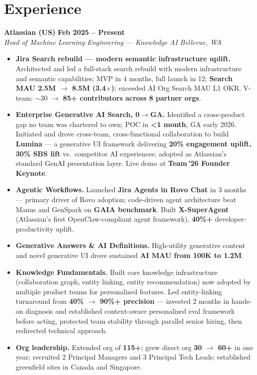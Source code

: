 \documentclass[10.5pt,letterpaper]{article}
\newcommand{\role}[4]{%
  \noindent\textbf{#1} \hfill \textbf{#3}\\
  \textit{#2} \hfill \textit{#4}\par\vspace{1pt}}
\begin{document}
\section*{Experience}

\role{Atlassian (US)}{Head of Machine Learning Engineering --- Knowledge AI}{Feb 2025 -- Present}{Bellevue, WA}
\begin{itemize}
  \item \textbf{Jira Search rebuild --- modern semantic infrastructure uplift.} Architected and led a full-stack search rebuild with modern infrastructure and semantic capabilities; MVP in 4 months, full launch in 12; \textbf{Search MAU 2.5M $\to$ 8.5M (3.4$\times$)}; exceeded AI Org Search MAU L1 OKR. V-team: $\sim$30 $\to$ \textbf{85+ contributors across 8 partner orgs}.
  \item \textbf{Enterprise Generative AI Search, 0$\to$GA.} Identified a cross-product gap no team was chartered to own; POC in \textbf{<1 month}, GA early 2026. Initiated and drove cross-team, cross-functional collaboration to build \textbf{Lumina} --- a generative UI framework delivering \textbf{20\% engagement uplift, 30\% SBS lift} vs.\ competitor AI experiences; adopted as Atlassian's standard GenAI presentation layer. Live demo at \textbf{Team\,'26 Founder Keynote}.
  \item \textbf{Agentic Workflows.} Launched \textbf{Jira Agents in Rovo Chat} in 3 months --- primary driver of Rovo adoption; code-driven agent architecture beat Manus and GenSpark on \textbf{GAIA benchmark}. Built \textbf{X-SuperAgent} (Atlassian's first OpenClaw-compliant agent framework), \textbf{40\%+} developer-productivity uplift.
  \item \textbf{Generative Answers \& AI Definitions.} High-utility generative content and novel generative UI drove sustained \textbf{AI MAU from 100K to 1.2M}.
  \item \textbf{Knowledge Fundamentals.} Built core knowledge infrastructure (collaboration graph, entity linking, entity recommendation) now adopted by multiple product teams for personalized features. Led entity-linking turnaround from \textbf{40\% $\to$ 90\%+ precision} --- invested 2 months in hands-on diagnosis and established context-aware personalized eval framework before acting, protected team stability through parallel senior hiring, then redirected technical approach.
  \item \textbf{Org leadership.} Extended org of \textbf{115+}; grew direct org \textbf{30 $\to$ 60+} in one year; recruited 2 Principal Managers and 3 Principal Tech Leads; established greenfield sites in Canada and Singapore.
\end{itemize}
\end{document}
